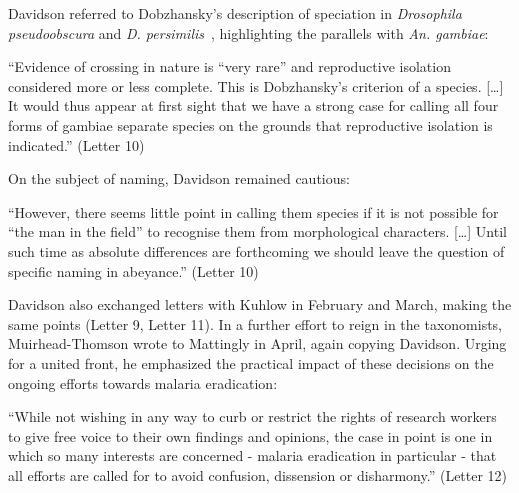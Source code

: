 \begin{refsection}
Davidson referred to Dobzhansky's description of speciation in \textit{Drosophila pseudoobscura} and \textit{D. persimilis}~\parencite{Dobzhansky1951}, highlighting the parallels with \textit{An. gambiae}:


\begin{displayquote}
``Evidence of crossing in nature is ``very rare'' and reproductive isolation considered more or less complete. This is Dobzhansky's criterion of a species. [\ldots] It would thus appear at first sight that we have a strong case for calling all four forms of gambiae separate species on the grounds that reproductive isolation is indicated.'' (Letter 10)
\end{displayquote}


On the subject of naming, Davidson remained cautious:


\begin{displayquote}
``However, there seems little point in calling them species if it is not possible for ``the man in the field'' to recognise them from morphological characters. [\ldots] Until such time as absolute differences are forthcoming we should leave the question of specific naming in abeyance.'' (Letter 10)
\end{displayquote}


Davidson also exchanged letters with Kuhlow in February and March, making the same points (Letter 9, Letter 11).
%
In a further effort to reign in the taxonomists, Muirhead-Thomson wrote to Mattingly in April, again copying Davidson.
%
Urging for a united front, he emphasized the practical impact of these decisions on the ongoing efforts towards malaria eradication:


\begin{displayquote}
``While not wishing in any way to curb or restrict the rights of research workers to give free voice to their own findings and opinions, the case in point is one in which so many interests are concerned - malaria eradication in particular - that all efforts are called for to avoid confusion, dissension or disharmony.'' (Letter 12)
\end{displayquote}



\end{refsection}
